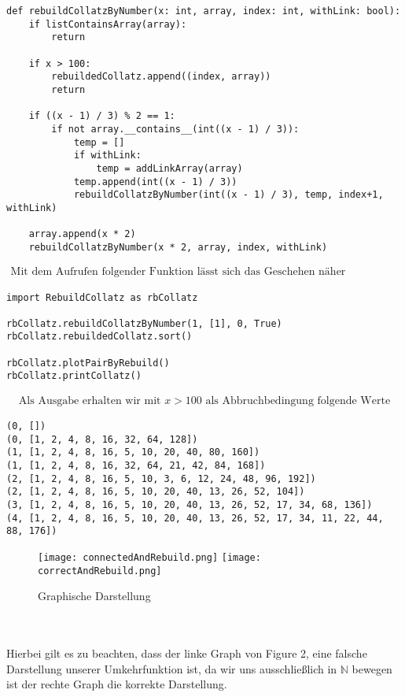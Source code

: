 \documentclass{article}
\begin{document}
\begin{verbatim}
def rebuildCollatzByNumber(x: int, array, index: int, withLink: bool):
    if listContainsArray(array):
        return

    if x > 100:
        rebuildedCollatz.append((index, array))
        return

    if ((x - 1) / 3) % 2 == 1:
        if not array.__contains__(int((x - 1) / 3)):
            temp = []
            if withLink:
                temp = addLinkArray(array)
            temp.append(int((x - 1) / 3))
            rebuildCollatzByNumber(int((x - 1) / 3), temp, index+1, withLink)

    array.append(x * 2)
    rebuildCollatzByNumber(x * 2, array, index, withLink)
\end{verbatim}
\begin{align*}
\text{Mit dem Aufrufen folgender Funktion lässt sich das Geschehen näher untersuchen.}
\end{align*}
\begin{verbatim}
import RebuildCollatz as rbCollatz

rbCollatz.rebuildCollatzByNumber(1, [1], 0, True)
rbCollatz.rebuildedCollatz.sort()

rbCollatz.plotPairByRebuild()
rbCollatz.printCollatz()
\end{verbatim}
\begin{align*}
\text{Als Ausgabe erhalten wir mit $x > 100$ als Abbruchbedingung folgende Werte}
\end{align*}
\begin{verbatim}
(0, [])
(0, [1, 2, 4, 8, 16, 32, 64, 128])
(1, [1, 2, 4, 8, 16, 5, 10, 20, 40, 80, 160])
(1, [1, 2, 4, 8, 16, 32, 64, 21, 42, 84, 168])
(2, [1, 2, 4, 8, 16, 5, 10, 3, 6, 12, 24, 48, 96, 192])
(2, [1, 2, 4, 8, 16, 5, 10, 20, 40, 13, 26, 52, 104])
(3, [1, 2, 4, 8, 16, 5, 10, 20, 40, 13, 26, 52, 17, 34, 68, 136])
(4, [1, 2, 4, 8, 16, 5, 10, 20, 40, 13, 26, 52, 17, 34, 11, 22, 44, 88, 176])
\end{verbatim}
\blindtext
\begin{wrapfigure}
\texttt{[image: connectedAndRebuild.png]}\hfill
\texttt{[image: correctAndRebuild.png]}
\caption{Graphische Darstellung}
\end{wrapfigure}
\blindtext
\\\\
Hierbei gilt es zu beachten, dass der linke Graph von Figure 2, eine falsche Darstellung unserer Umkehrfunktion ist, da wir uns ausschließlich in $\mathbb{N}$ bewegen ist der rechte Graph die korrekte Darstellung. \\
\end{document}
